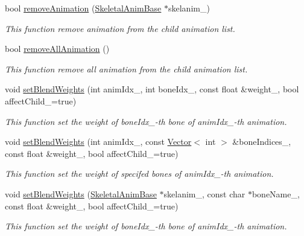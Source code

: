 \begin{DoxyCompactItemize}
bool \hyperlink{class_i_dream_sky_1_1_skeletal_anim_blender_acf0e3d7c7210cc049495cdc1748bcbf0}{remove\+Animation} (\hyperlink{class_i_dream_sky_1_1_skeletal_anim_base}{Skeletal\+Anim\+Base} $\ast$skelanim\+\_\+)
\begin{DoxyCompactList}\small\item\em This function remove animation from the child animation list. \end{DoxyCompactList}\item 
bool \hyperlink{class_i_dream_sky_1_1_skeletal_anim_blender_af2a93dc8cde09f0ac468f037539f085d}{remove\+All\+Animation} ()
\begin{DoxyCompactList}\small\item\em This function remove all animation from the child animation list. \end{DoxyCompactList}\item 
void \hyperlink{class_i_dream_sky_1_1_skeletal_anim_blender_acdb8305c5d999eebb633de6e631a8c8b}{set\+Blend\+Weights} (int anim\+Idx\+\_\+, int bone\+Idx\+\_\+, const float \&weight\+\_\+, bool affect\+Child\+\_\+=true)
\begin{DoxyCompactList}\small\item\em This function set the weight of bone\+Idx\+\_\+-\/th bone of anim\+Idx\+\_\+-\/th animation. \end{DoxyCompactList}\item 
void \hyperlink{class_i_dream_sky_1_1_skeletal_anim_blender_af2dc948d0b1767393e1c5d42f994743f}{set\+Blend\+Weights} (int anim\+Idx\+\_\+, const \hyperlink{class_i_dream_sky_1_1_vector}{Vector}$<$ int $>$ \&bone\+Indices\+\_\+, const float \&weight\+\_\+, bool affect\+Child\+\_\+=true)
\begin{DoxyCompactList}\small\item\em This function set the weight of specifed bones of anim\+Idx\+\_\+-\/th animation. \end{DoxyCompactList}\item 
void \hyperlink{class_i_dream_sky_1_1_skeletal_anim_blender_a54689afab6362501f7a2b9cb8256ba92}{set\+Blend\+Weights} (\hyperlink{class_i_dream_sky_1_1_skeletal_anim_base}{Skeletal\+Anim\+Base} $\ast$skelanim\+\_\+, const char $\ast$bone\+Name\+\_\+, const float \&weight\+\_\+, bool affect\+Child\+\_\+=true)
\begin{DoxyCompactList}\small\item\em This function set the weight of bone\+Idx\+\_\+-\/th bone of anim\+Idx\+\_\+-\/th animation. \end{DoxyCompactList}\item 

\end{DoxyCompactItemize}
